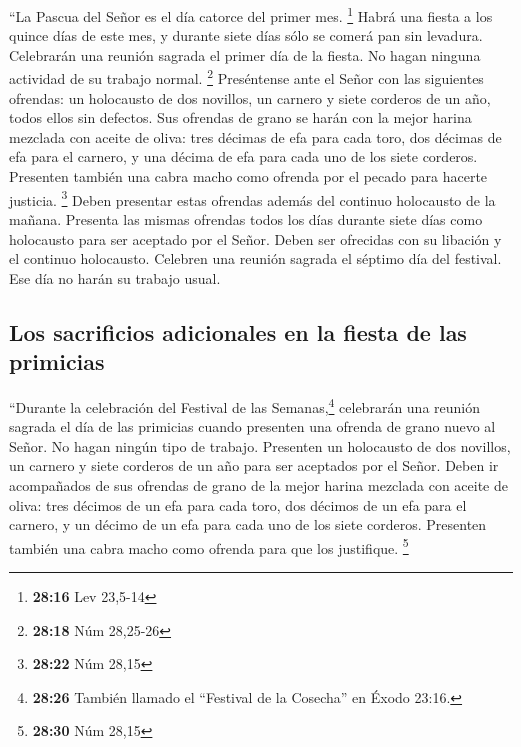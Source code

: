  ``La Pascua del Señor es el día catorce del primer mes.
\footnote{\textbf{28:16} Lev 23,5-14}  Habrá una fiesta a
los quince días de este mes, y durante siete días sólo se comerá pan sin
levadura.  Celebrarán una reunión sagrada el primer día
de la fiesta. No hagan ninguna actividad de su trabajo normal.
\footnote{\textbf{28:18} Núm 28,25-26}  Preséntense ante
el Señor con las siguientes ofrendas: un holocausto de dos novillos, un
carnero y siete corderos de un año, todos ellos sin defectos.
 Sus ofrendas de grano se harán con la mejor harina
mezclada con aceite de oliva: tres décimas de efa para cada toro, dos
décimas de efa para el carnero,  y una décima de efa para
cada uno de los siete corderos.  Presenten también una
cabra macho como ofrenda por el pecado para hacerte justicia.
\footnote{\textbf{28:22} Núm 28,15}  Deben presentar
estas ofrendas además del continuo holocausto de la mañana.
 Presenta las mismas ofrendas todos los días durante
siete días como holocausto para ser aceptado por el Señor. Deben ser
ofrecidas con su libación y el continuo holocausto. 
Celebren una reunión sagrada el séptimo día del festival. Ese día no
harán su trabajo usual.

\hypertarget{los-sacrificios-adicionales-en-la-fiesta-de-las-primicias}{%
\subsection{Los sacrificios adicionales en la fiesta de las
primicias}\label{los-sacrificios-adicionales-en-la-fiesta-de-las-primicias}}

 ``Durante la celebración del Festival de las
Semanas,\footnote{\textbf{28:26} También llamado el ``Festival de la
  Cosecha'' en Éxodo 23:16.} celebrarán una reunión sagrada el día de
las primicias cuando presenten una ofrenda de grano nuevo al Señor. No
hagan ningún tipo de trabajo.  Presenten un holocausto de
dos novillos, un carnero y siete corderos de un año para ser aceptados
por el Señor.  Deben ir acompañados de sus ofrendas de
grano de la mejor harina mezclada con aceite de oliva: tres décimos de
un efa para cada toro, dos décimos de un efa para el carnero,
 y un décimo de un efa para cada uno de los siete
corderos.  Presenten también una cabra macho como ofrenda
para que los justifique. \footnote{\textbf{28:30} Núm 28,15}

